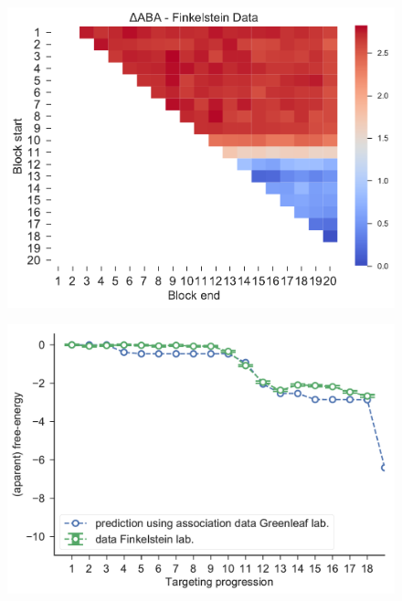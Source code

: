 \documentclass[a4paper,twoside]{revtex4-1}
\begin{document}
\begin{figure}[H]
\includegraphics[scale=0.5]{fig41_10_10_2018.pdf}
\end{figure}

\begin{figure}[H]
\includegraphics[scale=0.5]{fig42_10_10_2018.pdf}
\end{figure}
\end{document}
